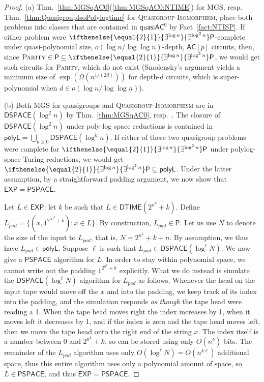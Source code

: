 \documentclass{article}
\newcommand{\algprobm}[1]{\textsc{#1}\xspace}
\newcommand{\betacc}[1]{\ifthenelse{\equal{#1}{1}}{\exists^{\log n}}{\exists^{\log^{#1}n}}} %
\newcommand{\Thm}[1]{Thm.~\ref{#1}\xspace}
\newcommand*{\ComplexityClass}[1]{\ensuremath{\mathsf{#1}}\xspace}
\renewcommand{\P}{\ComplexityClass{P}}
\newcommand*{\EXP}{\ComplexityClass{EXP}}
\newcommand*{\PSPACE}{\ComplexityClass{PSPACE}}
\newcommand{\qACz}{\ComplexityClass{quasiAC^0}}
\newcommand{\DTIME}{\ComplexityClass{DTIME}}
\begin{document}
\begin{proof}
(a) \Thm{thm:MGSqAC0}(\ref{thm:MGSqAC0:NTIME}) for \algprobm{MGS}, resp. \Thm{thm:QuasigroupIsoPolylogtime} for \algprobm{Quasigroup Isomorphism}, place both problems into classes that are contained in $\qACz$ by Fact~\ref{fact:NTISP}. If either problem were $\betacc{2}\P$-complete under quasi-polynomial size, $o(\log n / \log \log n)$-depth, $\mathsf{AC}[p]$ circuits, then, since $\algprobm{Parity} \in \P \subseteq \betacc{2}\P$, we would get such circuits for \algprobm{Parity}, which do not exist \cite{Razborov, Smolensky87algebraicmethods}  (Smolensky's argument yields a minimum size of $\exp(\Omega(n^{1/(2d)}))$ for depth-$d$ circuits, which is super-polynomial when $d \in o(\log n / \log \log n)$). 

(b) Both \algprobm{MGS} for quasigroups and \algprobm{Quasigroup Isomorphism} are in $\mathsf{DSPACE}(\log^2 n)$ by \Thm{thm:MGSqAC0}, resp.\ \cite{ChattopadhyayToranWagner}. The closure of $\mathsf{DSPACE}(\log^2 n)$ under poly-log space reductions is contained in $\mathsf{polyL} = \bigcup_{k \geq 0} \mathsf{DSPACE}(\log^k n)$. If either of these two quasigroup problems were complete for $\betacc{2} \P$ under polylog-space Turing reductions, we would get $\betacc{2} \P \subseteq \mathsf{polyL}$. Under the latter assumption, by a straightforward padding argument, we now show that $\EXP = \PSPACE$.

Let $L \in \EXP$; let $k$ be such that $L \in \DTIME(2^{n^k}+k)$. Define $L_{pad} = \{(x,1^{2^{|x|^k}+k}) : x \in L\}$. By construction, $L_{pad} \in \P$. Let us use $N$ to denote the size of the input to $L_{pad}$, that is, $N = 2^{n^k}+k+n$. By assumption, we thus have $L_{pad} \in \mathsf{polyL}$. Suppose $\ell$ is such that $L_{pad} \in \mathsf{DSPACE}(\log^\ell N)$. We now give a $\PSPACE$ algorithm for $L$. In order to stay within polynomial space, we cannot write out the padding $1^{2^{n^k}+k}$ explicitly. What we do instead is simulate the $\mathsf{DSPACE}(\log^\ell N)$ algorithm for $L_{pad}$ as follows. Whenever the head on the input tape would move off the $x$ and into the padding, we keep track of its index into the padding, and the simulation responds \emph{as though} the tape head were reading a 1. When the tape head moves right the index increases by 1, when it moves left it decreases by 1, and if the index is zero and the tape head moves left, then we move the tape head onto the right end of the string $x$. The index itself is a number between $0$ and $2^{n^k}+k$, so can be stored using only $O(n^k)$ bits. The remainder of the $L_{pad}$ algorithm uses only $O(\log^\ell N) = O(n^{k\ell})$ additional space, thus this entire algorithm uses only a polynomial amount of space, so $L \in \PSPACE$, and thus $\EXP=\PSPACE$.
\end{proof}
\end{document}
